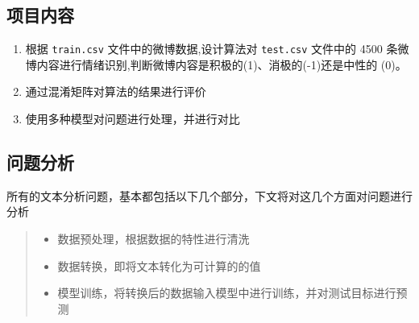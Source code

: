 \documentclass[UTF8]{ctexart}
\begin{document}

\subsection{项目内容}
\begin{enumerate}
    \item 根据  \lstinline{train.csv} 文件中的微博数据,设计算法对  \lstinline{test.csv} 文件中的 4500 条微
    博内容进行情绪识别,判断微博内容是积极的(1)、消极的(-1)还是中性的
    (0)。
    \item 通过混淆矩阵对算法的结果进行评价
    \item 使用多种模型对问题进行处理，并进行对比
\end{enumerate}

\subsection{问题分析}
所有的文本分析问题，基本都包括以下几个部分，下文将对这几个方面对问题进行分析
\begin{quote}
    \begin{itemize}
        \item 数据预处理，根据数据的特性进行清洗
        \item 数据转换，即将文本转化为可计算的的值
        \item 模型训练，将转换后的数据输入模型中进行训练，并对测试目标进行预测
    \end{itemize}
\end{quote}
\end{document}
